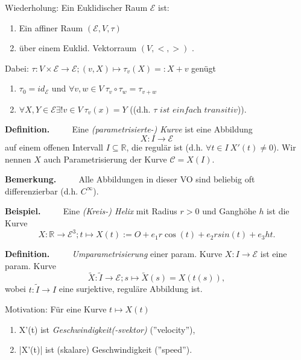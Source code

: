 \documentclass[a4paper,oneside,11pt,DIV=12,parskip=half]{scrartcl}
\newcommand{\R}{\mathbb R}
\newenvironment{definition}{\textbf{Definition.} ~~~~}{}
\newenvironment{note}{\textbf{Bemerkung.} ~~~~}{}
\newenvironment{example}{\textbf{Beispiel.} ~~~~}{}
\newenvironment{lemma, definition}{\textbf{Lemma und Definition.} ~~~~}{}
\newenvironment{note, example}{\textbf{Bemerkung und Beispiel.} ~~~~}{}
\newenvironment{note, definition}{\textbf{Bemerkung und Definition.} ~~~~}{}
\begin{document}
Wiederholung: Ein Euklidischer Raum $\mathcal{E}$ ist:
\begin{enumerate}
	\item Ein affiner Raum $(\mathcal{E},V,\tau)$ 
	\item über einem Euklid. Vektorraum $(V,<,>)$ .
\end{enumerate}

	Dabei: $\tau: V\times \mathcal{E} \rightarrow \mathcal{E}; (v,X) \mapsto \tau_v(X)=:X+v$ genügt
	\begin{enumerate}
		\item $\tau_0 = id_{\mathcal{E}}$ und $\forall v,w \in V ~ \tau_v \circ \tau_w = \tau_{v+w}$
		\item $\forall X,Y \in \mathcal{E} \exists! v \in V ~ \tau_v(x) = Y$ ((d.h. $\tau  \textit{ ist einfach transitiv}$)).
	\end{enumerate}
	
	
\begin{definition}
	Eine \textit{(parametrisierte-) Kurve} ist eine Abbildung \[X: I \rightarrow \mathcal{E}\] auf einem offenen Intervall $I \subseteq \R$, die regulär ist (d.h. $\forall t \in I ~ X'(t) \not = 0$).
	Wir nennen $X$ auch Parametrisierung der Kurve $\mathcal{C} = X(I)$.
\end{definition}

\begin{note}
	Alle Abbildungen in dieser VO sind beliebig oft differenzierbar (d.h. $C^{\infty}$).
\end{note}

\begin{example}
	Eine \textit{(Kreis-) Helix} mit Radius $r>0$ und Ganghöhe $h$ ist die Kurve
	\[X: \R \rightarrow \mathcal{E}^3; t \mapsto X(t) := O + e_1r\cos(t) + e_2rsin(t) + e_3ht. \]
\end{example}

\begin{definition}
	\textit{Umparametrisierung} einer param. Kurve $X: I \rightarrow \mathcal{E}$ ist eine param. Kurve
	\[\widetilde{X}: \widetilde{I} \rightarrow \mathcal{E}; s \mapsto \widetilde{X}(s)=X(t(s)),\]
	wobei $t: \widetilde{I} \rightarrow I$ eine surjektive, reguläre Abbildung ist.

\end{definition}

Motivation: Für eine Kurve $t \mapsto X(t)$ 
\begin{enumerate}
	\item X'(t) ist \textit{Geschwindigkeit(-svektor)} (''velocity''),
	\item |X'(t)| ist (skalare) Geschwindigkeit (''speed'').
\end{enumerate}
\end{document}
